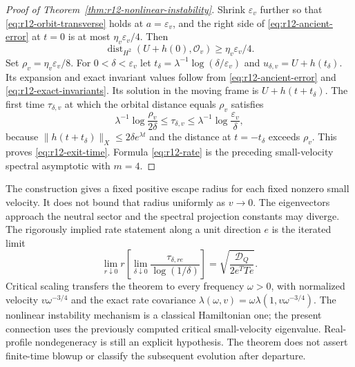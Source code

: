 \begin{proof}[Proof of Theorem~\ref{thm:r12-nonlinear-instability}]
Shrink $\varepsilon_v$ further so that
\eqref{eq:r12-orbit-transverse} holds at $a=\varepsilon_v$, and the
right side of \eqref{eq:r12-ancient-error} at $t=0$ is at most
$\eta_v\varepsilon_v/4$. Then
\[
 \operatorname{dist}_{H^2}(U+h(0),\mathcal O_v)
                         \ge\eta_v\varepsilon_v/4.
\]
Set $\rho_v=\eta_v\varepsilon_v/8$. For $0<\delta<\varepsilon_v$
let $t_\delta=\lambda^{-1}\log(\delta/\varepsilon_v)$ and
$u_{\delta,v}=U+h(t_\delta)$. Its expansion and exact invariant values
follow from \eqref{eq:r12-ancient-error} and
\eqref{eq:r12-exact-invariants}. Its solution in the moving frame is
$U+h(t+t_\delta)$. The first time $\tau_{\delta,v}$ at which the
orbital distance equals $\rho_v$ satisfies
\[
 \lambda^{-1}\log\frac{\rho_v}{2\delta}
 \le\tau_{\delta,v}\le
 \lambda^{-1}\log\frac{\varepsilon_v}{\delta},
\]
because $\|h(t+t_\delta)\|_X\le2\delta e^{\lambda t}$ and the
distance at $t=-t_\delta$ exceeds $\rho_v$.
This proves \eqref{eq:r12-exit-time}. Formula \eqref{eq:r12-rate}
is the preceding small-velocity spectral asymptotic with $m=4$.
\end{proof}

\begin{remark}
The construction gives a fixed positive escape radius for each fixed
nonzero small velocity. It does not bound that radius uniformly as
$v\to0$. The eigenvectors approach the neutral sector and the spectral
projection constants may diverge. The rigorously implied rate statement
along a unit direction $e$ is the iterated limit
\[
 \lim_{r\downarrow0}r\left[
   \lim_{\delta\downarrow0}
      \frac{\tau_{\delta,re}}{\log(1/\delta)}\right]
       =\sqrt{\frac{\mathcal D_Q}{2e^TTe}}.
\]
Critical scaling transfers the theorem to every frequency $\omega>0$,
with normalized velocity $v\omega^{-3/4}$ and the exact rate covariance
$\lambda(\omega,v)=\omega\lambda(1,v\omega^{-3/4})$.
The nonlinear instability mechanism is a classical Hamiltonian one;
the present connection uses the previously computed critical
small-velocity eigenvalue. Real-profile nondegeneracy is still an
explicit hypothesis. The theorem does not assert finite-time blowup or
classify the subsequent evolution after departure.
\end{remark}

